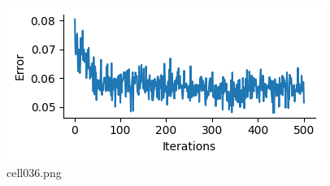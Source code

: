 \begin{figure}[ht]
	\centering
	\includegraphics[scale=0.8, max width=\linewidth]{./fig/energy-based-model/sparse-coding/cell036.png}
	\caption{cell036.png}
	\label{cell036.png}
\end{figure}